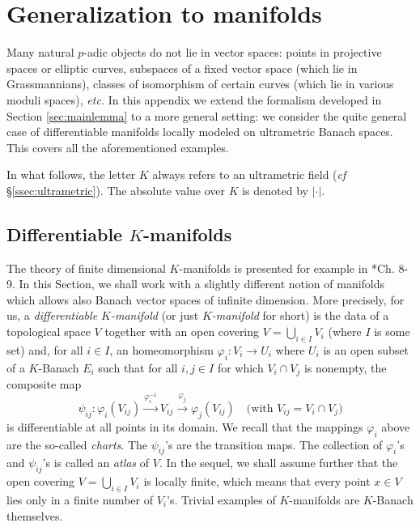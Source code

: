 \documentclass{lms}
\begin{document}
\appendix

\section{Generalization to manifolds}
\label{sec:manifold}

Many natural $p$-adic objects do not lie in vector spaces:
points in projective spaces or elliptic curves,
subspaces of a fixed vector space (which lie in Grassmannians),
classes of isomorphism of certain curves (which lie in various moduli spaces),
\emph{etc.}  In this appendix we extend the formalism 
developed in Section \ref{sec:mainlemma} to a more general setting:
we consider the quite general case of 
differentiable manifolds locally modeled on ultrametric Banach spaces.
This covers all the 
aforementioned examples.

In what follows, the letter $K$ always refers to an ultrametric field 
(\emph{cf} \S \ref{ssec:ultrametric}). The absolute value over $K$ is 
denoted by $|\cdot|$.

\subsection{Differentiable $K$-manifolds}
\label{ssec:manifold}

The theory of finite dimensional $K$-manifolds is presented for example 
in \cite{schneider:11a}*{Ch. 8-9}. In this Section, we shall work with
a slightly different notion of manifolds which allows also Banach vector 
spaces of infinite dimension.
More precisely, for us, a \emph{ differentiable $K$-manifold} 
(or just \emph{$K$-manifold} for short) is the data of a topological 
space $V$ together with an open covering $V = \bigcup_{i \in I} V_i$ 
(where $I$ is some set) and, for all $i \in I$, an homeomorphism 
$\varphi_i : V_i \to U_i$ where $U_i$ is an open subset of a $K$-Banach 
$E_i$ such that for all $i,j \in I$ for which $V_i \cap V_j$ is 
nonempty, the composite map
\begin{equation}
\label{eq:psiij}
\psi_{ij} : 
\varphi_i(V_{ij}) \stackrel{\varphi_i^{-1}}{\longrightarrow} 
V_{ij} \stackrel{\varphi_j}{\longrightarrow} \varphi_j(V_{ij})
\quad \text{(with } V_{ij} = V_i \cap V_j \text{)}
\end{equation}
is differentiable at all points in its domain. We recall that
the mappings $\varphi_i$ above are the so-called \emph{charts}. The
$\psi_{ij}$'s are the transition maps. The collection of $\varphi_i$'s
and $\psi_{ij}$'s is called an \emph{atlas} of $V$. In the sequel, we 
shall assume further that the open covering $V = \bigcup_{i \in I} V_i$ 
is locally finite, which means that every point $x \in V$ lies only in a 
finite number of $V_i$'s. Trivial examples of $K$-manifolds are 
$K$-Banach themselves.
\end{document}
